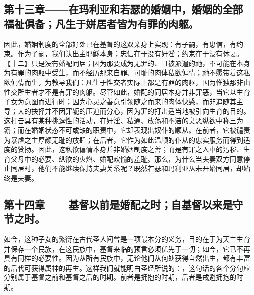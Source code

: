 
\subsection{第十三章——在玛利亚和若瑟的婚姻中，婚姻的全部福祉俱备；凡生于姘居者皆为有罪的肉躯。}

因此，婚姻制度的全部好处已在基督的这双亲身上实现：有子嗣，有忠信，有约束。作为子嗣，我们认出主耶稣本身；忠信在于没有奸淫；约束在于没有休妻。【十二】只是没有婚配同居；因为那要成为无罪的、且被派遣的祂，不可能在本身为有罪的肉躯中受生，而不经历那来自罪、可耻的肉体私欲偏情；祂不愿带着这私欲偏情而生，为教导我们：凡生于性交者实际上都是有罪的肉躯，因为惟独那非由性交所生者才不是有罪的肉躯。尽管如此，婚配的同居本身并非罪恶，当它以生育子女为意图而进行时；因为心灵之善意引领随之而来的肉体快感，而非追随其主导；人的抉择并不因罪轭的压迫而分心，因为罪的打击适当地被引向生育的目的。这打击具有某种挑逗性的活动，在奸淫、私通、放荡和不洁的臭恶纵欲中称王为霸；而在婚姻状态不可或缺的职责中，它却表现出奴仆的顺从。在前者，它被谴责为暴虐之主厚颜无耻的放肆；在后者，它作为如此温顺的仆从的忠实服务而得到适度的赞扬。因此，这私欲偏情本身并非婚姻制度之善；而是有罪之人中的污秽、生育父母中的必要、纵欲的火焰、婚配欢愉的羞耻。那么，为什么当夫妻双方同意停止同居时，他们不能继续保持夫妻关系呢？既然若瑟和玛利亚从未开始同居，却始终是夫妻。\par


\subsection{第十四章——基督以前是婚配之时；自基督以来是守节之时。}

如今，这种子女的繁衍在古代圣人间曾是一项最本分的义务，目的在于为天主生育并保存一个民族，在这民族中，基督来临的预言必须优先于一切；如今，它已不再具有同样的必要性。因为从所有民族中，无论他们从何处获得自然出生，都有丰富的后代可获得属神的再生。这样我们就能明白圣经所说的：\newline{}\newline{}，这句话的各个分句应分别属于基督之前和基督之后的时期。前者是拥抱的时期，后者是戒避拥抱的时期。\par



